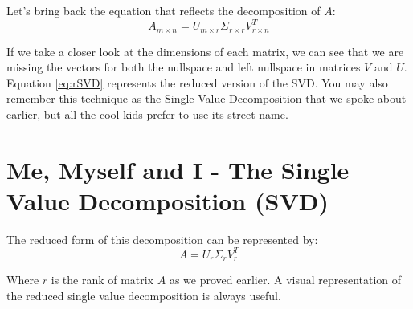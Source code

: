 \documentclass[a4,12pt,twosided,openany]{memoir}
\begin{document}
\par 
\indent
Let’s bring back the equation that reflects the decomposition of $A$:
\begin{equation}\label{eq:rSVD}
A_{m \times n} = U_{m \times r} \Sigma_{r \times r} V^T_{r \times n} 
\end{equation}
\par 
\indent
If we take a closer look at the dimensions of each matrix, we can see that we are missing the vectors for both the nullspace and left nullspace in matrices $V$ and $U$. Equation \ref{eq:rSVD} represents the reduced version of the SVD. You may also remember this technique as the Single Value Decomposition that we spoke about earlier, but all the cool kids prefer to use its street name.
\section{Me, Myself and I - The Single Value Decomposition (SVD)}
\par 
\indent
The reduced form of this decomposition can be represented by:
\[A = U_r \Sigma_r V^T_r\]
\par 
\indent
Where $r$ is the rank of matrix $A$ as we proved earlier. A visual representation of the reduced single value decomposition is always useful.
\end{document}
